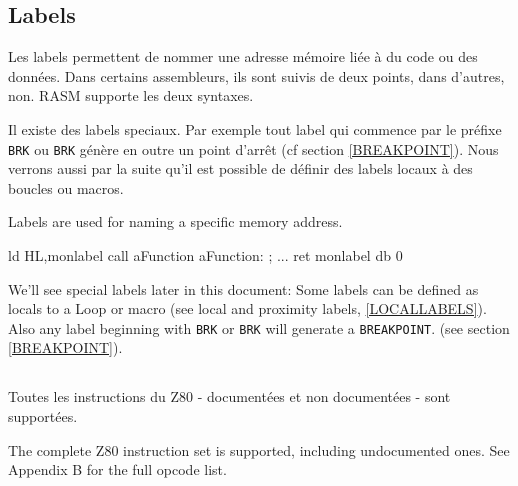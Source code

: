 \subsection{Labels}
\begin{xfr}
Les labels permettent de nommer une adresse mémoire liée à du code ou des données.
Dans certains assembleurs, ils sont suivis de deux points, dans d'autres, non. RASM supporte les deux syntaxes.

Il existe des labels speciaux. Par exemple tout label qui commence par le préfixe \texttt{BRK} ou \texttt{\at BRK} génère en outre un point d'arrêt (cf section \ref{BREAKPOINT}). Nous verrons aussi par la suite qu'il est possible de définir des labels locaux à des boucles ou macros.
\end{xfr}

\begin{xen}
Labels are used for naming a specific memory address.
\end{xen}

\begin{code}
 ld HL,monlabel
 call aFunction
aFunction:
; ...
 ret
monlabel db 0
\end{code}

\begin{xen}
We'll see special labels later in this document: Some labels can be defined as locals to a Loop or macro (see local and proximity labels, \ref{LOCALLABELS}).
Also any label beginning with \texttt{BRK} or \texttt{\at BRK} will generate a \texttt{BREAKPOINT}. (see section \ref{BREAKPOINT}).
\end{xen}


\subsection{}

\begin{xfr}
Toutes les instructions du Z80 - documentées et non documentées - sont supportées.
\end{xfr}

\begin{xen}
The complete Z80 instruction set is supported, including undocumented ones.
See Appendix B for the full opcode list.
\end{xen}

\subsubsection{}


